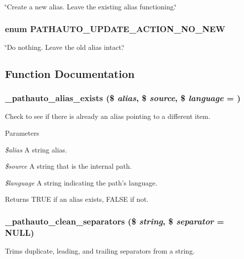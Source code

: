 \label{pathauto_8inc_ad0bb9837044c24b6f3c0f4b2cd66c94b}
\char`\"{}Create a new alias. Leave the existing alias functioning.\char`\"{} \hypertarget{pathauto_8inc_a70d61a7cceaca1c59abf30153aa8156c}{
\subsubsection[{PATHAUTO\_\-UPDATE\_\-ACTION\_\-NO\_\-NEW}]{\setlength{\rightskip}{0pt plus 5cm}enum {\bf PATHAUTO\_\-UPDATE\_\-ACTION\_\-NO\_\-NEW}}}
\label{pathauto_8inc_a70d61a7cceaca1c59abf30153aa8156c}
\char`\"{}Do nothing. Leave the old alias intact.\char`\"{} 

\subsection{Function Documentation}
\hypertarget{pathauto_8inc_add7c5186fb921739f6cccd5cf2a2c82a}{
\subsubsection[{\_\-pathauto\_\-alias\_\-exists}]{\setlength{\rightskip}{0pt plus 5cm}\_\-pathauto\_\-alias\_\-exists (\$ {\em alias}, \/  \$ {\em source}, \/  \$ {\em language} = {})}}
\label{pathauto_8inc_add7c5186fb921739f6cccd5cf2a2c82a}
Check to see if there is already an alias pointing to a different item.


\begin{DoxyParams}{Parameters}
\item[{\em \$alias}]A string alias. \item[{\em \$source}]A string that is the internal path. \item[{\em \$language}]A string indicating the path's language. \end{DoxyParams}
\begin{DoxyReturn}{Returns}
TRUE if an alias exists, FALSE if not. 
\end{DoxyReturn}
\hypertarget{pathauto_8inc_a84df3a794eb1448559c84aae690b4eb3}{
\subsubsection[{\_\-pathauto\_\-clean\_\-separators}]{\setlength{\rightskip}{0pt plus 5cm}\_\-pathauto\_\-clean\_\-separators (\$ {\em string}, \/  \$ {\em separator} = {\ttfamily NULL})}}
\label{pathauto_8inc_a84df3a794eb1448559c84aae690b4eb3}
Trims duplicate, leading, and trailing separators from a string.


